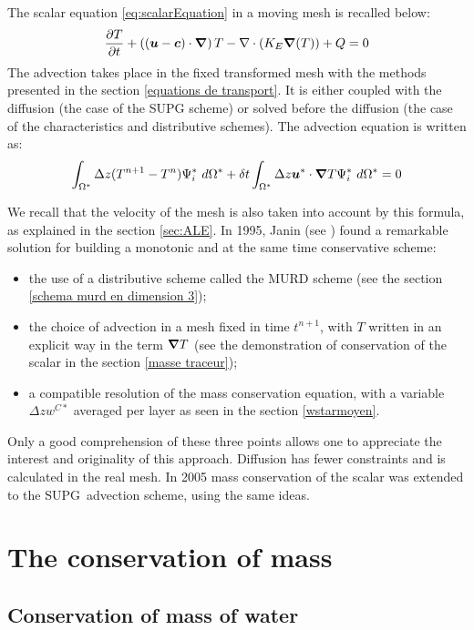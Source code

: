 The scalar equation \eqref{eq:scalarEquation} in a moving mesh is
recalled below:
\begin{equation}
\dfrac{\partial T}{\partial t}+\left((\bm{u}-\bm{c})\cdot\bm{\nabla}\right)
T - \nabla \cdot\left(K_E\bm{\nabla}(T)\right)+Q=0
\end{equation}
The advection takes place in the fixed transformed mesh
with the methods presented in the section \ref{equations de transport}.
It is either coupled with the diffusion (the case of the SUPG scheme) or
solved before the diffusion (the case of the characteristics
and distributive schemes). The advection equation is written as:%
\begin{equation}
\int_{\Omega^{\ast}}\Delta z(T^{n+1}-T^{n})\Psi_{i}^{\ast}~d\Omega^{\ast}
+\delta t\int_{\Omega^{\ast}}\Delta z\bm{u}^{\ast}\cdot\bm{\nabla} T
\Psi_{i}^{\ast}~d\Omega^{\ast}=0
\end{equation}

We recall that the velocity of the mesh is also taken into
account by this formula, as explained in the section \ref{sec:ALE}.
In 1995, Janin (see \cite{janin95}) found a remarkable solution for building a monotonic and at the same time conservative scheme:
\begin{itemize}
\item the use of a distributive scheme called the MURD scheme
(see the section \ref{schema murd en dimension 3});
\item the choice of advection in a mesh fixed in time $t^{n+1}$,
with $T$ written in an explicit way in the term $\bm{\nabla} T$
(see the demonstration of conservation of the scalar in the
section \ref{masse traceur});
\item a compatible resolution of the mass conservation equation,
with a variable $\Delta zw^{C\ast}$ averaged per layer as seen
in the section \ref{wstarmoyen}.
\end{itemize}

Only a good comprehension of these three points allows one to
appreciate the interest and originality of this approach.
Diffusion has fewer constraints and is calculated in the real mesh.
In 2005 mass conservation of the scalar was extended to the SUPG\ advection scheme, using the same ideas.

\section{\label{masse en 3D}The conservation of mass}

\subsection{\label{masse d'eau}Conservation of mass of water%
%
}

